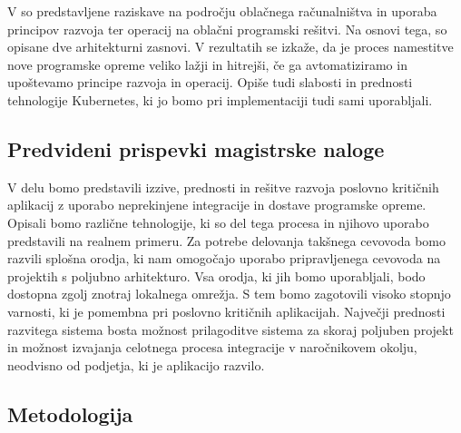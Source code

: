 \documentclass[a4paper, 12pt]{article}
\newcommand\cmnt[1]{\textcolor{munsell}{#1}}
\begin{document}
V \cite{KOCEVAR_2019} so predstavljene raziskave na področju oblačnega računalništva in uporaba principov razvoja ter operacij na oblačni programski rešitvi. Na osnovi tega, so opisane dve arhitekturni zasnovi. V rezultatih se izkaže, da je proces namestitve nove programske opreme veliko lažji in hitrejši, če ga avtomatiziramo in upoštevamo principe razvoja in operacij. Opiše tudi slabosti in prednosti tehnologije Kubernetes, ki jo bomo pri implementaciji tudi sami uporabljali.


\subsection{Predvideni prispevki magistrske naloge}


V delu bomo predstavili izzive, prednosti in rešitve razvoja poslovno kritičnih aplikacij z uporabo neprekinjene integracije in dostave programske opreme. Opisali bomo različne tehnologije, ki so del tega procesa in njihovo uporabo predstavili na realnem primeru. Za potrebe delovanja takšnega cevovoda bomo razvili splošna orodja, ki nam omogočajo uporabo pripravljenega cevovoda na projektih s poljubno arhitekturo.  Vsa orodja, ki jih bomo uporabljali, bodo dostopna zgolj znotraj lokalnega omrežja. S tem bomo zagotovili visoko stopnjo varnosti, ki je pomembna pri poslovno kritičnih aplikacijah. Največji prednosti razvitega sistema bosta možnost prilagoditve sistema za skoraj poljuben projekt in možnost izvajanja celotnega procesa integracije v naročnikovem okolju, neodvisno od podjetja, ki je aplikacijo razvilo.

\subsection{Metodologija}

\end{document}
